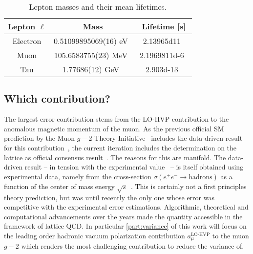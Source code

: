 \begin{table}
\begin{tabular}{ccc}
\toprule
Lepton $\ell$ & Mass & Lifetime [s] \\
\midrule
Electron &
0.51099895069(16) eV~\cite{codata:2022} &
\num{2.13965d11}~\cite{PhysRevLett.115.231802} \\
\midrule
Muon &
105.6583755(23) MeV~\cite{codata:2022} &
\num{2.1969811d-6}~\cite{beringer2012pdg,Patrignani_2016} \\
\midrule
Tau &
1.77686(12) GeV~\cite{codata:2022,PhysRevD.98.030001} &
\num{2.903d-13}~\cite{PhysRevD.98.030001} \\
\bottomrule
\end{tabular}
\caption{\label{tab:leptons}
Lepton masses and their mean lifetimes.}
\end{table}

\subsection{Which contribution?}
\label{sec:gm2:contribution}


The largest error contribution stems from the LO-HVP contribution to the anomalous magnetic momentum of the muon.
As the previous official SM prediction by the Muon $g-2$ Theory Initiative~\cite{online:gm2} includes the data-driven result for this contribution~\cite{snowmass:2020}, the current iteration includes the determination on the lattice as official consensus result~\cite{snowmass:2025}.
The reasons for this are manifold.
The data-driven result -- in tension with the experimental value~\cite{Muong-2:2006rrc,Muong-2:2021ojo} -- is itself obtained using experimental data, namely from the cross-section $\sigma(e^{+} e^{-} \rightarrow \text{hadrons})$ as a function of the center of mass energy $\sqrt{s}$~\cite{davier:2017zfy,keshavarzi:2018mgv,colangelo:2018mtw,hoferichter:2019mqg,davier:2019can,keshavarzi:2019abf}.
This is certainly not a first principles theory prediction, but was until recently the only one whose error was competitive with the experimental error estimations.
Algorithmic, theoretical and computational advancements over the years made the quantity accessible in the framework of lattice QCD.
In particular \cref{part:variance} of this work will focus on the leading order hadronic vacuum polarization contribution $a_{\mu}^{\text{LO-HVP}}$ to the muon $g-2$ which renders the most challenging contribution to reduce the variance of.

